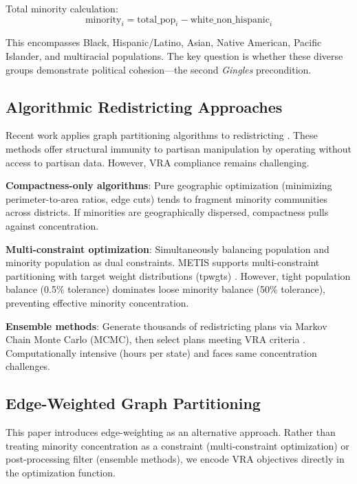 Total minority calculation:
\begin{equation}
\text{minority}_i = \text{total\_pop}_i - \text{white\_non\_hispanic}_i
\end{equation}

This encompasses Black, Hispanic/Latino, Asian, Native American, Pacific Islander, and multiracial populations. The key question is whether these diverse groups demonstrate political cohesion—the second \textit{Gingles} precondition.

\subsection{Algorithmic Redistricting Approaches}

Recent work applies graph partitioning algorithms to redistricting \citep{duchin2018,fifield2020}. These methods offer structural immunity to partisan manipulation by operating without access to partisan data. However, VRA compliance remains challenging.

\textbf{Compactness-only algorithms}: Pure geographic optimization (minimizing perimeter-to-area ratios, edge cuts) tends to fragment minority communities across districts. If minorities are geographically dispersed, compactness pulls against concentration.

\textbf{Multi-constraint optimization}: Simultaneously balancing population and minority population as dual constraints. METIS supports multi-constraint partitioning with target weight distributions (tpwgts) \citep{karypis1999}. However, tight population balance (0.5\% tolerance) dominates loose minority balance (50\% tolerance), preventing effective minority concentration.

\textbf{Ensemble methods}: Generate thousands of redistricting plans via Markov Chain Monte Carlo (MCMC), then select plans meeting VRA criteria \citep{duchin2018}. Computationally intensive (hours per state) and faces same concentration challenges.

\subsection{Edge-Weighted Graph Partitioning}

This paper introduces edge-weighting as an alternative approach. Rather than treating minority concentration as a constraint (multi-constraint optimization) or post-processing filter (ensemble methods), we encode VRA objectives directly in the optimization function.

